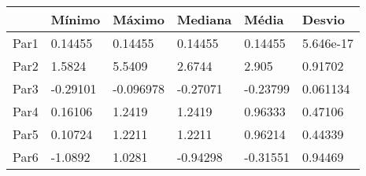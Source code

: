 \begin{tabular}{llllll}
& Mínimo & Máximo & Mediana & Média & Desvio \\ 
\hline 
Par1 & 0.14455 & 0.14455 & 0.14455 & 0.14455 & 5.646e-17 \\ 
Par2 & 1.5824 & 5.5409 & 2.6744 & 2.905 & 0.91702 \\ 
Par3 & -0.29101 & -0.096978 & -0.27071 & -0.23799 & 0.061134 \\ 
Par4 & 0.16106 & 1.2419 & 1.2419 & 0.96333 & 0.47106 \\ 
Par5 & 0.10724 & 1.2211 & 1.2211 & 0.96214 & 0.44339 \\ 
Par6 & -1.0892 & 1.0281 & -0.94298 & -0.31551 & 0.94469 \\ 
\hline 
\end{tabular}